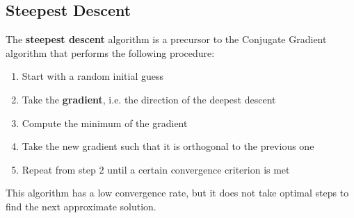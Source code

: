 \documentclass{article}
\begin{document}
\subsection{Steepest Descent}
The \textbf{steepest descent} algorithm is a precursor to the Conjugate Gradient algorithm that performs the following procedure:
\begin{enumerate}
    \item Start with a random initial guess
    \item Take the \textbf{gradient}, i.e. the direction of the deepest descent
    \item Compute the minimum of the gradient
    \item Take the new gradient such that it is orthogonal to the previous one
    \item Repeat from step $2$ until a certain convergence criterion is met
\end{enumerate}
This algorithm has a low convergence rate, but it does not take optimal steps to find the next approximate solution.
\end{document}
